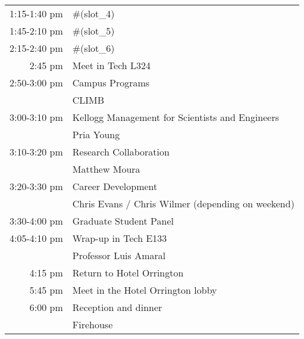 \documentclass{article}
\begin{document}
\begin{tabular}{ r    l }
1:15-1:40 pm    & #(slot_4) \rule{0cm}{0.4cm} \\ 

1:45-2:10 pm    & #(slot_5) \rule{0cm}{0.4cm} \\ 
 
2:15-2:40 pm    & #(slot_6) \rule{0cm}{0.4cm} \\ 

2:45 pm         & Meet in Tech L324 \rule{0cm}{0.4cm} \\

2:50-3:00 pm    & Campus Programs \rule{0cm}{0.4cm} \\ 
                & \hspace{5mm} CLIMB \\ 

3:00-3:10 pm    & Kellogg Management for Scientists and Engineers \rule{0cm}{0.4cm} \\ 
                & \hspace{5mm} Pria Young \\ 

3:10-3:20 pm    & Research Collaboration \rule{0cm}{0.4cm} \\ 
                & \hspace{5mm} Matthew Moura \\ 
        
3:20-3:30 pm    & Career Development \rule{0cm}{0.4cm} \\ 
                & \hspace{5mm} Chris Evans / Chris Wilmer (depending on weekend) \\

3:30-4:00 pm    & Graduate Student Panel \rule{0cm}{0.4cm} \\ 

4:05-4:10 pm    & Wrap-up in Tech E133 \rule{0cm}{0.4cm} \\ 
                & \hspace{5mm} Professor Luis Amaral \\ 

4:15 pm         & Return to Hotel Orrington \rule{0cm}{0.4cm} \\ 

5:45 pm         & Meet in the Hotel Orrington lobby \rule{0cm}{0.4cm} \\ 

6:00 pm         & Reception and dinner \rule{0cm}{0.4cm} \\
                & \hspace{5mm} Firehouse \\ 

\end{tabular}
\end{document}
